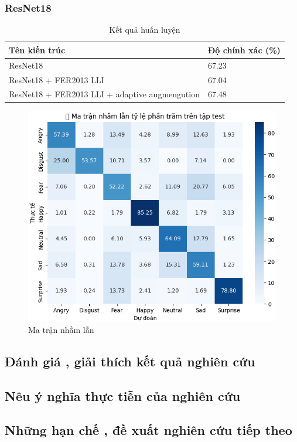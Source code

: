 \subsubsection{ResNet18}

\begin{table}[H]
\centering
\begin{tabular}{|l|l|}
\hline
\textbf{Tên kiến trúc} & \textbf{Độ chính xác (\%)} \\
\hline
ResNet18 & 67.23 \\
ResNet18 +  FER2013 LLI & 67.04 \\
ResNet18 +  FER2013 LLI +  adaptive augmengution & 67.48 \\
\hline
\end{tabular}
\caption{Kết quả huấn luyện}
\end{table}

\begin{figure}[H]
\centering
\includegraphics[width=1\textwidth]{img/confusionMatrixResnet18.png}  %
\caption{Ma trận nhầm lẫn}
\end{figure}
    
    

\subsection{Đánh giá  , giải thích kết quả nghiên  cứu}

\subsection{Nêu ý nghĩa thực tiễn của nghiên cứu}

\subsection{Những hạn chế , đề xuất nghiên cứu tiếp theo}